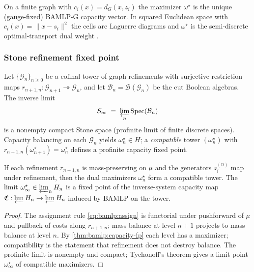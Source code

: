 \begin{corollary}\label{cor:bamlp:instances}
On a finite graph with $c_i(x)=d_G(x,z_i)$ the maximizer $\omega^\star$ is the
unique (gauge-fixed) BAMLP-G capacity vector. In squared Euclidean space with
$c_i(x)=\|x-s_i\|^2$ the cells are Laguerre diagrams and $\omega^\star$ is the
semi-discrete optimal-transport dual weight \cite{BAMLP:2026}.
\end{corollary}

\subsubsection{Stone refinement fixed point}

Let $\{\mathcal{G}_n\}_{n\ge0}$ be a cofinal tower of graph refinements with
surjective restriction maps $r_{n+1,n}:\mathcal{G}_{n+1}\twoheadrightarrow
\mathcal{G}_n$, and let $\mathcal{B}_n=\mathcal{B}(\mathcal{G}_n)$ be the
cut Boolean algebras. The inverse limit
\begin{equation}
  S_\infty\;=\;\varprojlim_n \mathrm{Spec}(\mathcal{B}_n)
\end{equation}
is a nonempty compact Stone space (profinite limit of finite discrete spaces).
Capacity balancing on each $\mathcal{G}_n$ yields $\omega^\star_n\in H$; a
\emph{compatible} tower $(\omega^\star_n)$ with $r_{n+1,n}(\omega^\star_{n+1})
=\omega^\star_n$ defines a profinite capacity fixed point.

\begin{theorem}\label{thm:bamlp:profinite}
If each refinement $r_{n+1,n}$ is mass-preserving on $\mu$ and the generators
$z_i^{(n)}$ map under refinement, then the dual maximizers $\omega^\star_n$
form a compatible tower. The limit $\omega^\star_\infty\in\varprojlim_n H_n$
is a fixed point of the inverse-system capacity map
$\mathfrak{C}: \varprojlim H_n \to \varprojlim H_n$ induced by BAMLP on the
tower.
\end{theorem}

\begin{proof}
The assignment rule \eqref{eq:bamlp:assign} is functorial under pushforward of
$\mu$ and pullback of costs along $r_{n+1,n}$; mass balance at level $n+1$
projects to mass balance at level $n$. By \autoref{thm:bamlp:capacity-fp} each
level has a maximizer; compatibility is the statement that refinement does not
destroy balance. The profinite limit is nonempty and compact; Tychonoff's
theorem gives a limit point $\omega^\star_\infty$ of compatible maximizers.
\end{proof}

